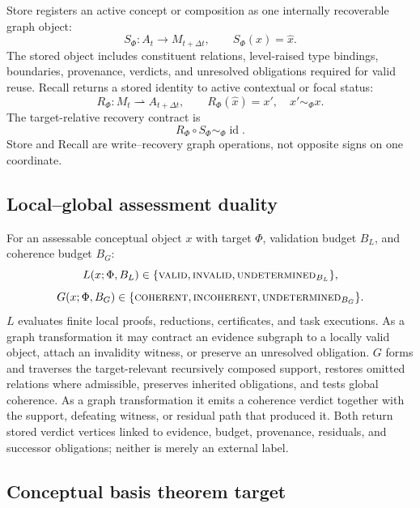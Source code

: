 \documentclass[11pt]{article}
\newcommand{\undetermined}{\textsc{undetermined}}
\newcommand{\valid}{\textsc{valid}}
\newcommand{\invalid}{\textsc{invalid}}
\newcommand{\coherent}{\textsc{coherent}}
\newcommand{\incoherent}{\textsc{incoherent}}
\begin{document}
Store registers an active concept or composition as one internally recoverable graph object:
\begin{equation}
S_\Phi:A_t\rightarrow M_{t+\Delta t},\qquad S_\Phi(x)=\widehat x.
\end{equation}
The stored object includes constituent relations, level-raised type bindings, boundaries, provenance, verdicts, and unresolved obligations required for valid reuse. Recall returns a stored identity to active contextual or focal status:
\begin{equation}
R_\Phi:M_t\rightharpoonup A_{t+\Delta t},\qquad R_\Phi(\widehat x)=x',\quad x'\sim_\Phi x.
\end{equation}
The target-relative recovery contract is
\begin{equation}
R_\Phi\circ S_\Phi\sim_\Phi\operatorname{id}.
\end{equation}
Store and Recall are write--recovery graph operations, not opposite signs on one coordinate.

\subsection{Local--global assessment duality}

For an assessable conceptual object $x$ with target $\Phi$, validation budget $B_L$, and coherence budget $B_G$:
\begin{equation}
L(x;\Phi,B_L)\in\{\valid,\invalid,\undetermined_{B_L}\},
\end{equation}
\begin{equation}
G(x;\Phi,B_G)\in\{\coherent,\incoherent,\undetermined_{B_G}\}.
\end{equation}
$L$ evaluates finite local proofs, reductions, certificates, and task executions. As a graph transformation it may contract an evidence subgraph to a locally valid object, attach an invalidity witness, or preserve an unresolved obligation. $G$ forms and traverses the target-relevant recursively composed support, restores omitted relations where admissible, preserves inherited obligations, and tests global coherence. As a graph transformation it emits a coherence verdict together with the support, defeating witness, or residual path that produced it. Both return stored verdict vertices linked to evidence, budget, provenance, residuals, and successor obligations; neither is merely an external label.

\subsection{Conceptual basis theorem target}
\end{document}
